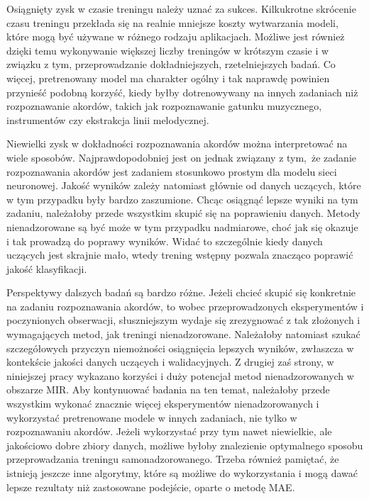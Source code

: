 Osiągnięty zysk w czasie treningu należy uznać za sukces. Kilkukrotne skrócenie czasu treningu przekłada się na realnie mniejsze koszty wytwarzania modeli, które mogą być używane w różnego rodzaju aplikacjach. Możliwe jest również dzięki temu wykonywanie większej liczby treningów w krótszym czasie i w związku z tym, przeprowadzanie dokładniejszych, rzetelniejszych badań. Co więcej, pretrenowany model ma charakter ogólny i tak naprawdę powinien przynieść podobną korzyść, kiedy byłby dotrenowywany na innych zadaniach niż rozpoznawanie akordów, takich jak rozpoznawanie gatunku muzycznego, instrumentów czy ekstrakcja linii melodycznej.

Niewielki zysk w dokładności rozpoznawania akordów można interpretować na wiele sposobów. Najprawdopodobniej jest on jednak związany z tym, że zadanie rozpoznawania akordów jest zadaniem stosunkowo prostym dla modelu sieci neuronowej. Jakość wyników zależy natomiast głównie od danych uczących, które w tym przypadku były bardzo zaszumione. Chcąc osiągnąć lepsze wyniki na tym zadaniu, należałoby przede wszystkim skupić się na poprawieniu danych. Metody nienadzorowane są być może w tym przypadku nadmiarowe, choć jak się okazuje i tak prowadzą do poprawy wyników. Widać to szczególnie kiedy danych uczących jest skrajnie mało, wtedy trening wstępny pozwala znacząco poprawić jakość klasyfikacji.

Perspektywy dalszych badań są bardzo różne. Jeżeli chcieć skupić się konkretnie na zadaniu rozpoznawania akordów, to wobec przeprowadzonych eksperymentów i poczynionych obserwacji, słuszniejszym wydaje się zrezygnować z tak złożonych i wymagających metod, jak treningi nienadzorowane. Należałoby natomiast szukać szczegółowych przyczyn niemożności osiągnięcia lepszych wyników, zwłaszcza w kontekście jakości danych uczących i walidacyjnych. Z drugiej zaś strony, w niniejszej pracy wykazano korzyści i duży potencjał metod nienadzorowanych w obszarze MIR. Aby kontynuować badania na ten temat, należałoby przede wszystkim wykonać znacznie więcej eksperymentów nienadzorowanych i wykorzystać pretrenowane modele w innych zadaniach, nie tylko w rozpoznawaniu akordów. Jeżeli wykorzystać przy tym nawet niewielkie, ale jakościowo dobre zbiory danych, możliwe byłoby znalezienie optymalnego sposobu przeprowadzania treningu samonadzorowanego. Trzeba również pamiętać, że istnieją jeszcze inne algorytmy, które są możliwe do wykorzystania i mogą dawać lepsze rezultaty niż zastosowane podejście, oparte o metodę MAE.
